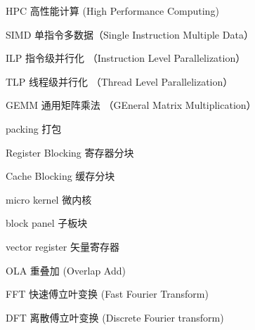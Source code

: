 
\begin{denotation}[3cm]
\item[HPC] 高性能计算 (High Performance Computing)
\item[SIMD] 单指令多数据（Single Instruction Multiple Data）
\item[ILP] 指令级并行化 （Instruction Level Parallelization）
\item[TLP] 线程级并行化 （Thread Level Parallelization）
\item[GEMM] 通用矩阵乘法 （GEneral Matrix Multiplication）
\item[packing] 打包 
\item[Register Blocking] 寄存器分块
\item[Cache Blocking] 缓存分块
\item[micro kernel] 微内核
\item[block panel] 子板块
\item[vector register] 矢量寄存器
\item[OLA] 重叠加 (Overlap Add)
\item[FFT] 快速傅立叶变换 (Fast Fourier Transform)
\item[DFT] 离散傅立叶变换 (Discrete Fourier transform)
\end{denotation}





